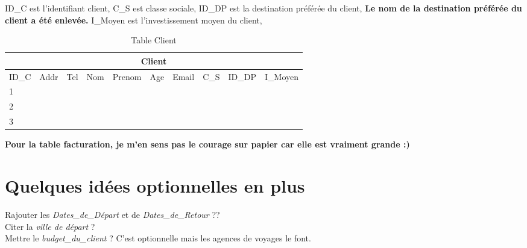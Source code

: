 
\begin{table}[h]
ID\_C est l'identifiant client,
C\_S est classe sociale,
ID\_DP est la destination préférée du client,
\textbf{Le nom de la destination préférée du client a été enlevée.}
I\_Moyen est l'investissement moyen du client,
\bigskip

\begin{tabular}{|l|c|c|c|c|c|c|c|c|c|}
\hline
\multicolumn{10}{|c|}{Client}\\
\hline
ID\_C& Addr& Tel & Nom & Prenom & Age & Email&C\_S & ID\_DP &I\_Moyen\\
\hline
1 & & &&  &  & &&&\\
\hline
2 & & &&  &  & &&&\\
\hline
3 & & &&  &  & &&&\\
\hline
\end{tabular}
\caption{Table Client}
\end{table}


\textbf{Pour la table facturation, je m'en sens pas le courage sur papier car elle est vraiment grande :) }

\section{Quelques idées optionnelles en plus}
Rajouter les \textit{Dates\_de\_Départ} et de \textit{Dates\_de\_Retour} ?? \\
Citer la \textit{ville de départ} ? \\
Mettre le \textit{budget\_du\_client} ? C'est optionnelle mais les agences de voyages le font. \\

